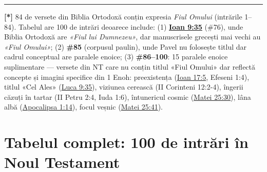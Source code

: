 \documentclass[12pt,a4paper,twoside,openany]{book}
\begin{document}
\bigskip\noindent\textcolor{darkred}{\rule{\textwidth}{2pt}}\bigskip

\begin{contextbox}
\textbf{[*]} 84 de versete din Biblia Ortodoxă conțin expresia \textit{Fiul Omului} (intrările 1–84). Tabelul are 100 de intrări deoarece include: (1) \textbf{\href{https://bibliaortodoxa.ro/carte.php?id=35\&cap=9\#35}{Ioan 9:35}} (\#76), unde Biblia Ortodoxă are \textit{«Fiul lui Dumnezeu»}, dar manuscrisele grecești mai vechi au \textit{«Fiul Omului»}; (2) \textbf{\#85} (corpusul paulin), unde Pavel nu folosește titlul dar cadrul conceptual are paralele enoice; (3) \textbf{\#86–100}: 15 paralele enoice suplimentare — versete din NT care nu conțin titlul «Fiul Omului» dar reflectă concepte și imagini specifice din 1 Enoh: preexistența (\href{https://bibliaortodoxa.ro/carte.php?id=35\&cap=17\#5}{Ioan 17:5}, Efeseni 1:4), titlul «Cel Ales» (\href{https://bibliaortodoxa.ro/carte.php?id=48\&cap=9\#35}{Luca 9:35}), viziunea cerească (II Corinteni 12:2-4), îngerii căzuți în tartar (II Petru 2:4, Iuda 1:6), întunericul cosmic (\href{https://bibliaortodoxa.ro/carte.php?id=55\&cap=25\#30}{Matei 25:30}), lâna albă (\href{https://bibliaortodoxa.ro/carte.php?id=4\&cap=1\#14}{Apocalipsa 1:14}), focul veșnic (\href{https://bibliaortodoxa.ro/carte.php?id=55\&cap=25\#41}{Matei 25:41}).
\end{contextbox}

\chapter{Tabelul complet: 100 de intrări în Noul Testament}\label{tabel-nt}
\end{document}
